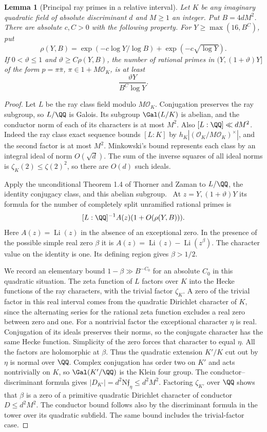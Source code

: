 \documentclass[a4paper,11pt]{article}
\newtheorem{lemma}[proposition]{Lemma}
\theoremstyle{definition}
\theoremstyle{remark}
\numberwithin{equation}{section}
\begin{document}
\begin{lemma}[Principal ray primes in a relative interval]
\label{lem:ray88}
Let \(K\) be any imaginary quadratic field of absolute
discriminant \(d\) and \(M\ge1\) an integer. Put \(B=4dM^2\).
There are absolute \(c,C>0\) with the following property. For
\(Y\ge \max(16,B^C)\), put
\[
     \rho(Y,B)=\exp(-c\log Y/\log B)+\exp(-c\sqrt{\log Y}).
\]
If \(0<\vartheta\le1\) and \(\vartheta\ge C\rho(Y,B)\),
the number of rational primes in \((Y,(1+\vartheta)Y]\)
of the form \(p=\pi\bar\pi\), \(\pi\in1+M\mathcal O_K\), is at least
\[
              \frac{\vartheta Y}{B^C\log Y}.
\]
\end{lemma}
\begin{proof}
Let \(L\) be the ray class field modulo \(M\mathcal O_K\). Conjugation
preserves the ray subgroup, so \(L/\QQ\) is Galois. Its subgroup
\(\Gal(L/K)\) is abelian, and the conductor norm of each of its
characters is at most \(M^2\). Also \([L:\QQ]\ll dM^2\). Indeed
the ray class exact sequence bounds \([L:K]\) by
\(h_K|(\mathcal O_K/M\mathcal O_K)^\times|\), and the second factor is at
most \(M^2\). Minkowski's bound represents each class by an
integral ideal of norm \(O(\sqrt d)\). The sum of the inverse
squares of all ideal norms is \(\zeta_K(2)\le\zeta(2)^2\), so
there are \(O(d)\) such ideals.

Apply the unconditional Theorem 1.4 of Thorner and Zaman to
\(L/\QQ\), the identity conjugacy class, and this abelian
subgroup.~\cite{I-I-I-tz50} At \(z=Y,(1+\vartheta)Y\) its formula
for the number of completely split unramified rational primes
is
\[
   [L:\QQ]^{-1}A(z)(1+O(\rho(Y,B))).
\]
Here \(A(z)=\operatorname{Li}(z)\) in the absence of an
exceptional zero. In the presence of the possible simple real
zero \(\beta\) it is
\(A(z)=\operatorname{Li}(z)-\operatorname{Li}(z^\beta)\).
The character value on the identity is one. Its defining region gives \(\beta>1/2\).

We record an elementary bound \(1-\beta\gg B^{-C_0}\) for an
absolute \(C_0\) in this quadratic situation. The zeta function
of \(L\) factors over \(K\) into the Hecke functions of the ray
characters, with the trivial factor \(\zeta_K\). A zero of the
trivial factor in this real interval comes from the quadratic
Dirichlet character of \(K\), since the alternating series for
the rational zeta function excludes a real zero between zero
and one. For a nontrivial factor the exceptional character
\(\eta\) is real. Conjugation of its ideals preserves their
norms, so the conjugate character has the same Hecke function.
Simplicity of the zero forces that character to equal \(\eta\).
All the factors are holomorphic at \(\beta\). Thus the quadratic
extension \(K'/K\) cut out by \(\eta\) is normal over \(\QQ\).
Complex conjugation has order two on \(K'\) and acts
nontrivially on \(K\), so \(\Gal(K'/\QQ)\) is the Klein four
group. The conductor--discriminant formula gives
\(|D_{K'}|=d^2\mathrm N\mathfrak f_\eta\le d^2M^2\).
Factoring \(\zeta_{K'}\) over \(\QQ\) shows that \(\beta\)
is a zero of a primitive quadratic Dirichlet character of
conductor \(D\le d^2M^2\). The conductor bound follows also by
the discriminant formula in the tower over its quadratic
subfield. The same bound includes the trivial-factor case.


\end{proof}
\end{document}

